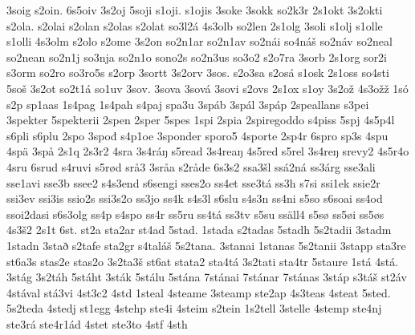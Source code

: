 {    3soig
    s2oin.
    6s5oiv
    3s2oj
    5soji
    s1oji.
    s1ojis
    3soke
    3sokk
    so2k3r
    2s1okt
    3s2okti
    s2ola.
    s2olai
    s2olan
    s2olas
    s2olat
    so3l2á
    4s3olb
    so2len
    2s1olg
    3soli
    s1olj
    s1olle
    s1olli
    4s3olm
    s2olo
    s2ome
    3s2on
    so2n1ar
    so2n1av
    so2nái
    so4náš
    so2náv
    so2neal
    so2nean
    so2n1j
    so3nja
    so2n1o
    sono2s
    so2n3us
    so3o2
    s2o7ra
    3sorb
    2s1org
    sor2i
    s3orm
    so2ro
    so3ro5s
    s2orp
    3sortt
    3s2orv
    3sos.
    s2o3sa
    s2osá
    s1osk
    2s1oss
    so4sti
    5soš
    3s2ot
    so2t1á
    so1uv
    3sov.
    3sova
    3sová
    3sovi
    s2ovs
    2s1ox
    s1oy
    3s2ož
    4s3ožž
    1só
    s2p
    sp1aas
    1s4pag
    1s4pah
    s4paj
    spa3u
    3spáb
    3spál
    3spáp
    2speallans
    s3pei
    3spekter
    5spekterii
    2spen
    2sper
    5spes
    1spi
    2spia
    2spiregoddo
    s4piss
    5spj
    4s5p4l
    s6pli
    s6plu
    2spo
    3spođ
    s4p1oe
    3sponder
    sporo5
    4sporte
    2sp4r
    6spro
    sp3s
    4spu
    4spä
    3spå
    2s1q
    2s3r2
    4sra
    3s4ráŋ
    s5read
    3s4reaŋ
    4s5red
    s5rel
    3s4reŋ
    srevy2
    4s5r4o
    4sru
    6srud
    s4ruvi
    s5rød
    srå3
    3sråa
    s2råde
    6s3s2
    ssa3šl
    ssá2ná
    ss3árg
    sse3ali
    sse1avi
    sse3b
    ssee2
    s4s3end
    s6sengi
    sses2o
    ss4et
    sse3tá
    ss3h
    s7si
    ssi1ek
    ssie2r
    ssi3ev
    ssi3is
    ssio2s
    ssi3s2o
    ss3jo
    ss4k
    s4s3l
    s6slu
    s4s3n
    ss4ni
    s5so
    s6soai
    ss4od
    ssoi2dasi
    s6s3olg
    ss4p
    s4spo
    ss4r
    ss5ru
    ss4tá
    ss3tv
    s5su
    ssäll4
    s5sø
    ss5øi
    ss5øs
    4s3š2
    2s1t
    6st.
    st2a
    sta2ar
    st4ad
    5stad.
    1stada
    s2tadas
    5stadh
    5s2tadii
    3stadm
    1stadn
    3stað
    s2tafe
    sta2gr
    s4taláš
    5s2tana.
    3stanai
    1stanas
    5s2tanii
    3stapp
    sta3re
    st6a3s
    stas2e
    stas2o
    3s2ta3š
    st6at
    stata2
    sta4tá
    3s2tati
    sta4tr
    5staure
    1stá
    4stá.
    3stág
    3s2táh
    5stáht
    3sták
    5stálu
    5stána
    7stánai
    7stánar
    7stánas
    3stáp
    s3táš
    st2áv
    4stával
    stá3vi
    4st3c2
    4std
    1steal
    4steame
    3steamp
    ste2ap
    4s3teas
    4steat
    5sted.
    5s2teda
    4stedj
    st1egg
    4stehp
    ste4i
    4steim
    s2tein
    1s2tell
    3stelle
    4stemp
    ste4nj
    ste3rá
    ste4r1ád
    4stet
    ste3to
    4stf
    4sth
}

